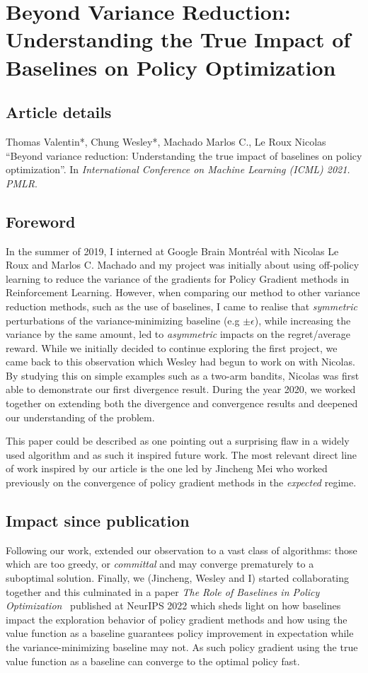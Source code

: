 \chapter{Beyond Variance Reduction: Understanding the True Impact of Baselines on Policy Optimization}
\label{chapter:baselines}
\section*{Article details}
Thomas Valentin*, Chung Wesley*, Machado Marlos C., Le Roux Nicolas ``Beyond variance reduction: Understanding the true impact of baselines on policy optimization''. In \emph{International Conference on Machine Learning (ICML) 2021. PMLR}.

\section*{Foreword}
In the summer of 2019, I interned at Google Brain Montr\'{e}al with Nicolas Le Roux and Marlos C. Machado and my project was initially about using off-policy learning to reduce the variance of the gradients for Policy Gradient methods in Reinforcement Learning. However, when comparing our method to other variance reduction methods, such as the use of baselines, I came to realise that \emph{symmetric} perturbations of the variance-minimizing baseline (e.g $\pm \epsilon$), while increasing the variance by the same amount, led to \emph{asymmetric} impacts on the regret/average reward. While we initially decided to continue exploring the first project, we came back to this observation which Wesley had begun to work on with Nicolas. By studying this on simple examples such as a two-arm bandits, Nicolas was first able to demonstrate our first divergence result. During the year 2020, we worked together on extending both the divergence and convergence results and deepened our understanding of the problem.

This paper could be described as one pointing out a surprising flaw in a widely used algorithm and as such it inspired future work. The most relevant direct line of work inspired by our article is the one led by Jincheng Mei who worked previously on the convergence of policy gradient methods in the \emph{expected} regime. 

\section*{Impact since publication}
Following our work, \citet{mei2021understanding} extended our observation to a vast class of algorithms: those which are too greedy, or \emph{committal} and may converge prematurely to a suboptimal solution. Finally, we (Jincheng, Wesley and I) started collaborating together and this culminated in a paper \emph{The Role of Baselines in Policy Optimization}~\citep{mei2022role} published at NeurIPS 2022 which sheds light on how baselines impact the exploration behavior of policy gradient methods and how using the value function as a baseline guarantees policy improvement in expectation while the variance-minimizing baseline may not. As such policy gradient using the true value function as a baseline can converge to the optimal policy fast.



